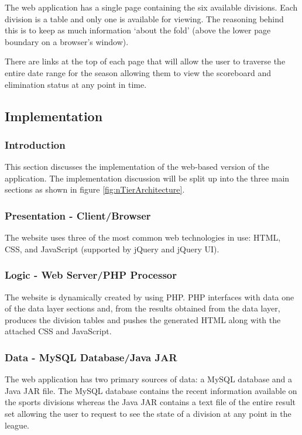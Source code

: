 The web application has a single page containing the six available divisions.
Each division is a table and only one is available for viewing. The reasoning
behind this is to keep as much information `about the fold' (above the lower
page boundary on a browser's window).

There are links at the top of each page that will allow the user to traverse
the entire date range for the season allowing them to view the scoreboard and
elimination status at any point in time.

\subsection{Implementation}

\subsubsection{Introduction}

This section discusses the implementation of the web-based version of the
application. The implementation discussion will be split up into the three
main sections as shown in figure \ref{fig:nTierArchitecture}.

\subsubsection{Presentation - Client/Browser}

The website uses three of the most common web technologies in use: HTML, CSS,
and JavaScript (supported by jQuery and jQuery UI).

\subsubsection{Logic - Web Server/PHP Processor}

The website is dynamically created by using PHP. PHP interfaces with data one
of the data layer sections and, from the results obtained from the data layer,
produces the division tables and pushes the generated HTML along with the
attached CSS and JavaScript.

\subsubsection{Data - MySQL Database/Java JAR}

The web application has two primary sources of data: a MySQL database and a
Java JAR file. The MySQL database contains the recent information available
on the sports divisions whereas the Java JAR contains a text file of the entire
result set allowing the user to request to see the state of a division at any
point in the league.
